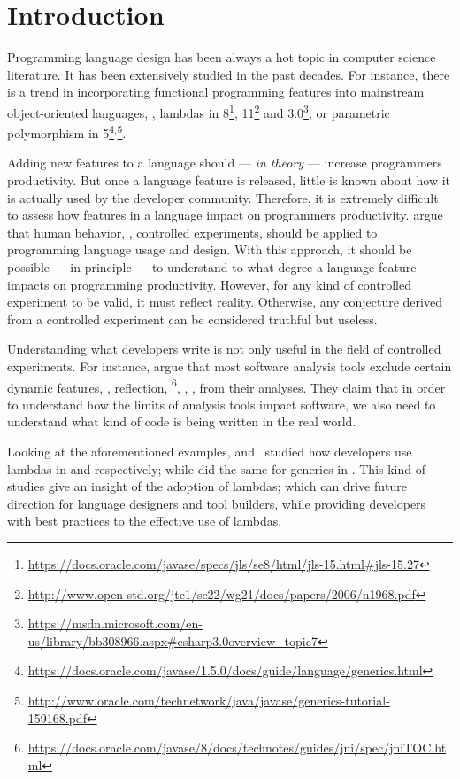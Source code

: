 
\chapter{Introduction}

Programming language design has been always a hot topic in computer science literature.
It has been extensively studied in the past decades.
For instance, there is a trend in incorporating functional programming features into mainstream object-oriented languages, \eg{}, lambdas in \java{} 8\footnote{\url{https://docs.oracle.com/javase/specs/jls/se8/html/jls-15.html\#jls-15.27}}, \cpp{}11\footnote{\url{http://www.open-std.org/jtc1/sc22/wg21/docs/papers/2006/n1968.pdf}} and \cs{} 3.0\footnote{\url{https://msdn.microsoft.com/en-us/library/bb308966.aspx\#csharp3.0overview_topic7}};
or parametric polymorphism in \java{} 5\footnote{\url{https://docs.oracle.com/javase/1.5.0/docs/guide/language/generics.html}}$^{,}$\footnote{\url{http://www.oracle.com/technetwork/java/javase/generics-tutorial-159168.pdf}}.

Adding new features to a language should --- \emph{in theory} --- increase programmers productivity.
But once a language feature is released, little is known about how it is actually used by the developer community.
Therefore, it is extremely difficult to assess how features in a language impact on programmers productivity.
\cite{hanenberg_faith_2010,hanenberg_why_2014} argue that human behavior, \ie{}, controlled experiments, should be applied to programming language usage and design.
With this approach, it should be possible --- in principle --- to understand to what degree a language feature impacts on programming productivity.
However, for any kind of controlled experiment to be valid, it must reflect reality.
Otherwise, any conjecture derived from a controlled experiment can be considered truthful but useless.

Understanding what developers write is not only useful in the field of controlled experiments.
For instance, \cite{livshits_defense_2015} argue that most software analysis tools exclude certain dynamic features, \eg{}, reflection, \jni{}\footnote{\url{https://docs.oracle.com/javase/8/docs/technotes/guides/jni/spec/jniTOC.html}}, \eval{}, \etc{}, from their analyses.
They claim that in order to understand how the limits of analysis tools impact software,
we also need to understand what kind of code is being written in the real world.

Looking at the aforementioned examples, \cite{mazinanian_understanding_2017} and~\cite{uesbeck_empirical_2016}
studied how developers use lambdas in \java{} and \cpp{} respectively; while \cite{parnin_java_2011,parnin_adoption_2013} did the same for generics in \java{}.
This kind of studies give an insight of the adoption of lambdas;
which can drive future direction for language designers and tool builders,
while providing developers with best practices to the effective use of lambdas.


